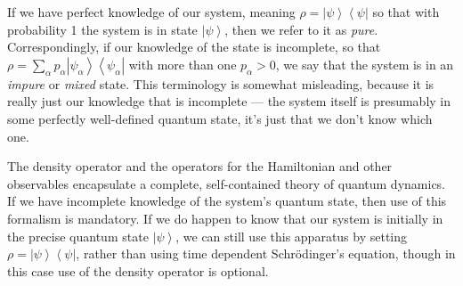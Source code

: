 \documentclass{article}
\theoremstyle{plain}\theoremheaderfont{\normalfont\itshape}\theorembodyfont{\rmfamily}\theoremseparator{.}\newtheorem*{rem}{Remark}\newtheorem*{ex}{Example}\newtheorem*{proof}{Proof}\newtheorem*{altp}{Alternative proof}
\theoremstyle{plain}\theoremheaderfont{\normalfont\bfseries}\theorembodyfont{\rmfamily}\theoremseparator{.}\newtheorem{thm}{Theorem}[section]\newtheorem{lem}[thm]{Lemma}\newtheorem{prop}[thm]{Proposition}\newtheorem*{cor}{Corollary}\newtheorem{defn}[thm]{Definition}\newtheorem{clm}[thm]{Claim}\newtheorem{clminproof}{Claim}
\theoremstyle{break}\theoremheaderfont{\normalfont\itshape}\theorembodyfont{\rmfamily}\theoremseparator{.\medskip}\newtheorem*{proofskip}{Proof}\newtheorem*{exs}{Examples}\newtheorem*{rems}{Remarks}
\theoremstyle{break}\theoremheaderfont{\normalfont\bfseries}\theorembodyfont{\rmfamily}\theoremseparator{.\medskip}\newtheorem{lemskip}[thm]{Lemma}\newtheorem{defnskip}[thm]{Definition}\newtheorem{propskip}[thm]{Proposition}\newtheorem{thmskip}[thm]{Theorem}
\numberwithin{equation}{section}
\newcommand{\bra}[1]{\left\langle #1 \right|}
\newcommand{\ket}[1]{\left| #1 \right\rangle}
\begin{document}
    If we have perfect knowledge of our system, meaning \(\rho=\ket{\psi}\bra{\psi}\) so that with probability 1 the system is in state \(\ket{\psi}\), then we refer to it as \textit{pure}. Correspondingly, if our knowledge of the state is incomplete, so that \(\rho=\sum_\alpha p_\alpha\ket{\psi_\alpha}\bra{\psi_\alpha}\) with more than one \(p_\alpha>0\), we say that the system is in an \textit{impure} or \textit{mixed} state. This terminology is somewhat misleading, because it is really just our knowledge that is incomplete --- the system itself is presumably in some perfectly well-defined quantum state, it's just that we don't know which one.

    The density operator and the operators for the Hamiltonian and other observables encapsulate a complete, self-contained theory of quantum dynamics. If we have incomplete knowledge of the system's quantum state, then use of this formalism is mandatory. If we do happen to know that our system is initially in the precise quantum state \(\ket{\psi}\), we can still use this apparatus by setting \(\rho=\ket{\psi}\bra{\psi}\), rather than using time dependent Schr\"{o}dinger's equation, though in this case use of the density operator is optional.
\end{document}

